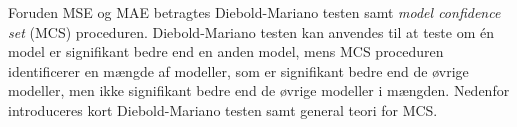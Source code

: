 Foruden MSE og MAE betragtes Diebold-Mariano testen samt \textit{model confidence set} (MCS) proceduren.
Diebold-Mariano testen kan anvendes til at teste om én model er signifikant bedre end en anden model, mens MCS proceduren identificerer en mængde af modeller, som er signifikant bedre end de øvrige modeller, men ikke signifikant bedre end de øvrige modeller i mængden.
Nedenfor introduceres kort Diebold-Mariano testen samt general teori for MCS.
%


%

%
%
